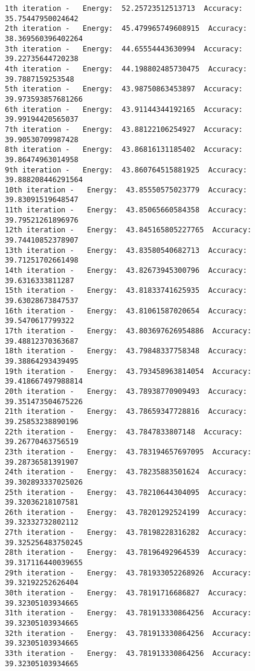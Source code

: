 \documentclass[11pt]{article}
\begin{document}
    \begin{Verbatim}[commandchars=\\\{\}]
1th iteration -   Energy:  52.25723512513713  Accuracy:  35.75447950024642
2th iteration -   Energy:  45.479965749608915  Accuracy:  38.369560396402264
3th iteration -   Energy:  44.65554443630994  Accuracy:  39.22735644720238
4th iteration -   Energy:  44.198802485730475  Accuracy:  39.7887159253548
5th iteration -   Energy:  43.98750863453897  Accuracy:  39.973593857681266
6th iteration -   Energy:  43.91144344192165  Accuracy:  39.99194420565037
7th iteration -   Energy:  43.88122106254927  Accuracy:  39.90530709987428
8th iteration -   Energy:  43.86816131185402  Accuracy:  39.86474963014958
9th iteration -   Energy:  43.860764515881925  Accuracy:  39.888208446291564
10th iteration -   Energy:  43.85550575023779  Accuracy:  39.83091519648547
11th iteration -   Energy:  43.85065660584358  Accuracy:  39.79521261896976
12th iteration -   Energy:  43.845165805227765  Accuracy:  39.74410852378907
13th iteration -   Energy:  43.83580540682713  Accuracy:  39.71251702661498
14th iteration -   Energy:  43.82673945300796  Accuracy:  39.6316333811287
15th iteration -   Energy:  43.81833741625935  Accuracy:  39.63028673847537
16th iteration -   Energy:  43.81061587020654  Accuracy:  39.5470617799322
17th iteration -   Energy:  43.803697626954886  Accuracy:  39.48812370363687
18th iteration -   Energy:  43.79848337758348  Accuracy:  39.38864293439495
19th iteration -   Energy:  43.793458963814054  Accuracy:  39.418667497988814
20th iteration -   Energy:  43.78938770909493  Accuracy:  39.351473504675226
21th iteration -   Energy:  43.78659347728816  Accuracy:  39.25853238890196
22th iteration -   Energy:  43.7847833807148  Accuracy:  39.26770463756519
23th iteration -   Energy:  43.783194657697095  Accuracy:  39.28736581391907
24th iteration -   Energy:  43.78235883501624  Accuracy:  39.302893337025026
25th iteration -   Energy:  43.78210644304095  Accuracy:  39.32036218107581
26th iteration -   Energy:  43.78201292524199  Accuracy:  39.32332732802112
27th iteration -   Energy:  43.78198228316282  Accuracy:  39.325256483750245
28th iteration -   Energy:  43.78196492964539  Accuracy:  39.317116440039655
29th iteration -   Energy:  43.781933052268926  Accuracy:  39.32192252626404
30th iteration -   Energy:  43.78191716686827  Accuracy:  39.32305103934665
31th iteration -   Energy:  43.781913330864256  Accuracy:  39.32305103934665
32th iteration -   Energy:  43.781913330864256  Accuracy:  39.32305103934665
33th iteration -   Energy:  43.781913330864256  Accuracy:  39.32305103934665

\end{Verbatim}
\end{document}
